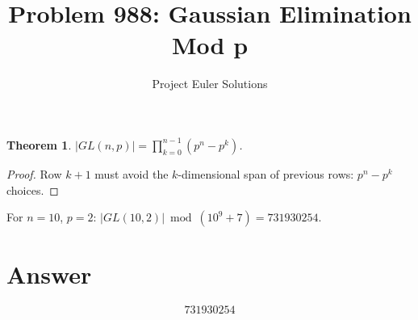 \documentclass[11pt]{article}
\title{Problem 988: Gaussian Elimination Mod p}
\author{Project Euler Solutions}
\date{}
\newtheorem{theorem}{Theorem}
\begin{document}
\maketitle
\begin{theorem}
$|GL(n, p)| = \prod_{k=0}^{n-1}(p^n - p^k)$.
\end{theorem}
\begin{proof}
Row $k+1$ must avoid the $k$-dimensional span of previous rows: $p^n - p^k$ choices.
\end{proof}
For $n=10$, $p=2$: $|GL(10,2)| \bmod (10^9+7) = 731930254$.
\section{Answer}

\[
\boxed{731930254}
\]
\end{document}
